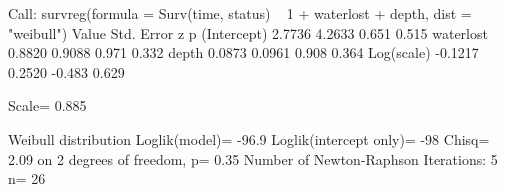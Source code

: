 Call:
survreg(formula = Surv(time, status) ~ 1 + waterlost + depth, 
    dist = "weibull")
              Value Std. Error      z     p
(Intercept)  2.7736     4.2633  0.651 0.515
waterlost    0.8820     0.9088  0.971 0.332
depth        0.0873     0.0961  0.908 0.364
Log(scale)  -0.1217     0.2520 -0.483 0.629

Scale= 0.885 

Weibull distribution
Loglik(model)= -96.9   Loglik(intercept only)= -98
	Chisq= 2.09 on 2 degrees of freedom, p= 0.35 
Number of Newton-Raphson Iterations: 5 
n= 26 